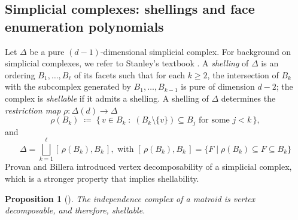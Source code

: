 \documentclass[11pt,a4paper,reqno]{amsart}
\theoremstyle{results}
\newtheorem{proposition}[thm]{Proposition}
\theoremstyle{definitions}
\begin{document}
\subsection{Simplicial complexes: shellings and face enumeration polynomials}
\label{sec:prelim-shell}
Let $\Delta$ be a pure $(d-1)$-dimensional simplicial complex. For background on simplicial complexes, we refer to Stanley's textbook \cite{stanley1996combinatorics}. A
\emph{shelling} of $\Delta$ is an ordering $B_1, \dots, B_\ell$ of its facets such
that for each $k \geqslant 2$, the intersection of $B_k$ with the subcomplex
generated by $B_1, \dots, B_{k-1}$ is pure of dimension $d-2$; the complex is
\emph{shellable} if it admits a shelling.  A shelling of $\Delta$ determines the \emph{restriction
map} $\rho \colon \Delta(d) \to \Delta$
\begin{equation}
  \label{eq:restriction}
  \rho(B_k) \;\coloneqq\; \big\{\, v \in B_k \;:\; (B_k \setminus\{v\}) \subseteq B_j \text{ for some } j < k \,\big\},
\end{equation}
and
\begin{equation}
  \label{eq:shelling-partition}
  \Delta = \bigsqcup_{k = 1}^{\ell} [\,\rho(B_k), B_k\,], \text{ with } [\,\rho(B_k), B_k\, ] = \{F \mid \rho(B_k) \subseteq F \subseteq B_k\}
\end{equation}
Provan and Billera introduced vertex decomposability of a simplicial complex, which is a stronger property that implies shellability.
\begin{proposition}[\cite{provan1980decompositions}]\label{thm:vd-shellability}
  The independence complex of a matroid is vertex decomposable, and therefore, shellable.
\end{proposition}
\end{document}
